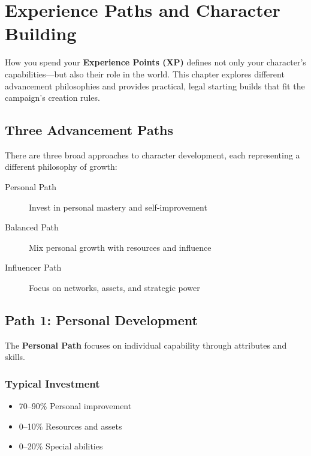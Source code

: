 
\chapter{Experience Paths and Character Building}
\label{ch:xp-paths}

\begin{multicols}{2}

How you spend your \textbf{Experience Points (XP)} defines not only your character's capabilities—but also their role in the world. This chapter explores different advancement philosophies and provides practical, legal starting builds that fit the campaign’s creation rules.

\section{Three Advancement Paths}

There are three broad approaches to character development, each representing a different philosophy of growth:

\begin{description}
\item[Personal Path] Invest in personal mastery and self-improvement
\item[Balanced Path] Mix personal growth with resources and influence
\item[Influencer Path] Focus on networks, assets, and strategic power
\end{description}

\section{Path 1: Personal Development}

The \textbf{Personal Path} focuses on individual capability through attributes and skills.

\subsection*{Typical Investment}
\begin{itemize}
\item 70--90\% Personal improvement
\item 0--10\% Resources and assets
\item 0--20\% Special abilities
\end{itemize}


\end{multicols}
